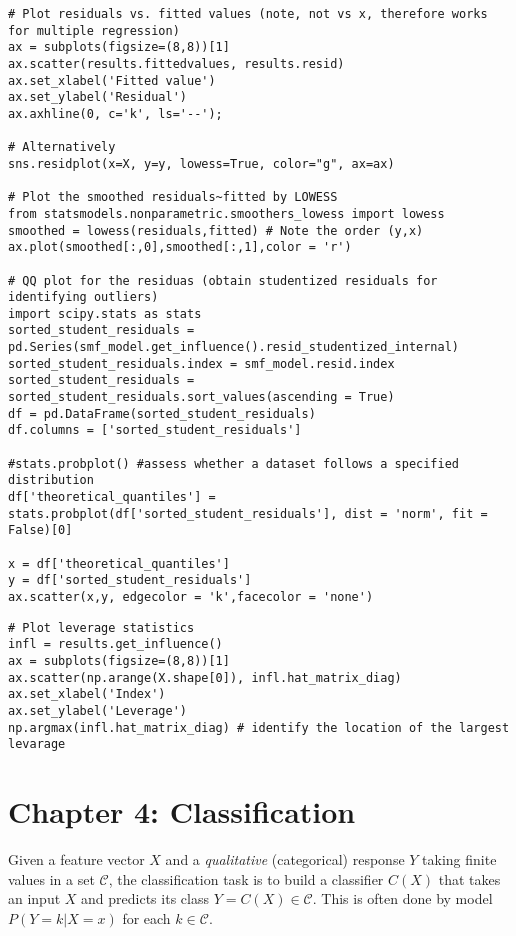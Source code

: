 \documentclass[
  letterpaper,
  DIV=11,
  numbers=noendperiod]{scrreprt}
\begin{document}
\begin{verbatim}
# Plot residuals vs. fitted values (note, not vs x, therefore works for multiple regression)
ax = subplots(figsize=(8,8))[1]
ax.scatter(results.fittedvalues, results.resid)
ax.set_xlabel('Fitted value')
ax.set_ylabel('Residual')
ax.axhline(0, c='k', ls='--');

# Alternatively
sns.residplot(x=X, y=y, lowess=True, color="g", ax=ax)

# Plot the smoothed residuals~fitted by LOWESS
from statsmodels.nonparametric.smoothers_lowess import lowess
smoothed = lowess(residuals,fitted) # Note the order (y,x)
ax.plot(smoothed[:,0],smoothed[:,1],color = 'r')

# QQ plot for the residuas (obtain studentized residuals for identifying outliers)
import scipy.stats as stats
sorted_student_residuals = pd.Series(smf_model.get_influence().resid_studentized_internal)
sorted_student_residuals.index = smf_model.resid.index
sorted_student_residuals = sorted_student_residuals.sort_values(ascending = True)
df = pd.DataFrame(sorted_student_residuals)
df.columns = ['sorted_student_residuals']

#stats.probplot() #assess whether a dataset follows a specified distribution
df['theoretical_quantiles'] = stats.probplot(df['sorted_student_residuals'], dist = 'norm', fit = False)[0] 
    
x = df['theoretical_quantiles']
y = df['sorted_student_residuals']
ax.scatter(x,y, edgecolor = 'k',facecolor = 'none')
\end{verbatim}

\begin{verbatim}
# Plot leverage statistics
infl = results.get_influence()
ax = subplots(figsize=(8,8))[1]
ax.scatter(np.arange(X.shape[0]), infl.hat_matrix_diag)
ax.set_xlabel('Index')
ax.set_ylabel('Leverage')
np.argmax(infl.hat_matrix_diag) # identify the location of the largest levarage
\end{verbatim}


\chapter{Chapter 4: Classification}\label{chapter-4-classification}

Given a feature vector \(X\) and a \emph{qualitative} (categorical)
response \(Y\) taking finite values in a set \(\mathcal{C}\), the
classification task is to build a classifier \(C(X)\) that takes an
input \(X\) and predicts its class \(Y=C(X)\in \mathcal{C}\). This is
often done by model \(P(Y=k|X=x)\) for each \(k\in \mathcal{C}\).
\end{document}
